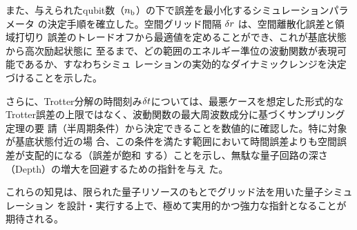 \documentclass[fontsize=11pt]{jlreq}
\begin{document}
また、与えられたqubit数（$n_{\mathrm{b}}$）の下で誤差を最小化するシミュレーションパラメータ
の決定手順を確立した。空間グリッド間隔 $\delta r$ は、空間離散化誤差と領域打切り
誤差のトレードオフから最適値を定めることができ、これが基底状態から高次励起状態に
至るまで、どの範囲のエネルギー準位の波動関数が表現可能であるか、すなわちシミュ
レーションの実効的なダイナミックレンジを決定づけることを示した。

さらに、Trotter分解の時間刻み$\delta t$については、最悪ケースを想定した形式的な
Trotter誤差の上限ではなく、波動関数の最大周波数成分に基づくサンプリング定理の要
請（半周期条件）から決定できることを数値的に確認した。特に対象が基底状態付近の場
合、この条件を満たす範囲において時間誤差よりも空間誤差が支配的になる（誤差が飽和
する）ことを示し、無駄な量子回路の深さ（Depth）の増大を回避するための指針を与え
た。

これらの知見は、限られた量子リソースのもとでグリッド法を用いた量子シミュレーション
を設計・実行する上で、極めて実用的かつ強力な指針となることが期待される。

\printbibliography[heading=bibintoc, title={参考文献}]


\end{document}
